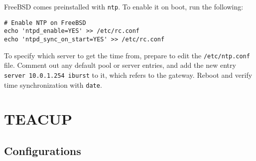 FreeBSD comes preinstalled with \lstinline{ntp}. To enable it on boot, run the following:

\begin{verbatim}
# Enable NTP on FreeBSD
echo 'ntpd_enable=YES' >> /etc/rc.conf
echo 'ntpd_sync_on_start=YES' >> /etc/rc.conf
\end{verbatim}

To specify which server to get the time from, prepare to edit the \lstinline{/etc/ntp.conf} file. Comment out any default pool or server entries, and add the new entry \lstinline{server 10.0.1.254 iburst} to it, which refers to the gateway. Reboot and verify time synchronization with \lstinline{date}.



















\chapter{TEACUP}


\section{Configurations} \label{teacup_configs}